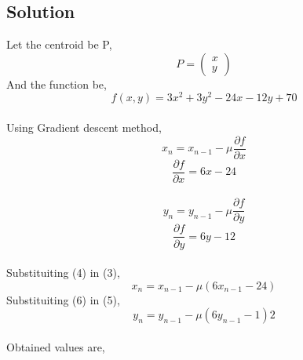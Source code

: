 \documentclass[journal,12pt,twocolumn]{IEEEtran}
\begin{document}
\begin{tableofcontents}
\section{Solution}
Let the centroid be P,
\begin{equation}
P=
\begin{pmatrix}
x\\
y
\end{pmatrix}
\end{equation}
And the function be,
\begin{equation}
f(x,y)=3x^2+3y^2-24x-12y+70
\end{equation}
\\
Using Gradient descent method,
\begin{equation}
x_n=x_{n-1}-\mu\frac{\partial f}{\partial x}
\end{equation}
\begin{equation}
\frac{\partial f}{\partial x}= 6x-24
\end{equation}
\\
\begin{equation}
y_n=y_{n-1}-\mu\frac{\partial f}{\partial y}
\end{equation}
\begin{equation}
\frac{\partial f}{\partial y}= 6y-12
\end{equation}
\\
Substituiting (4) in (3),
\begin{equation}
x_n=x_{n-1}-\mu(6x_{n-1}-24)
\end{equation} 
Substituiting (6) in (5),
\begin{equation}
y_n=y_{n-1}-\mu(6y_{n-1}-1)2
\end{equation} 
\\
Obtained values are,
\\
\vspace{3cm}
\end{tableofcontents}
\end{document}
